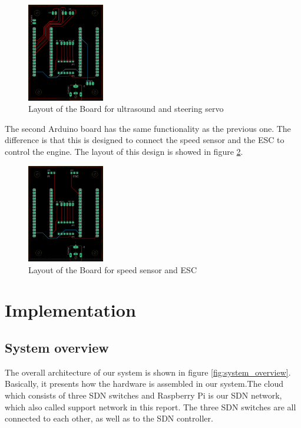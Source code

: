 \documentclass[11pt, titlepage]{article} %
\begin{document}
\begin{figure}
	\includegraphics[width=0.3\textwidth]{borad_layout_seervo_ultra.png}
	\caption{Layout of the Board for ultrasound and steering servo}
	\label{fig:board_layout_ultra_servo}
\end{figure}

The second Arduino board has the same functionality as the previous one. The difference is that this is designed to connect the speed sensor and the ESC to control the engine. The layout of this design is showed in figure \ref{fig:board_layout_ir_esc}.

\begin{figure}
	\includegraphics[width=0.3\textwidth]{borad_layout_ir_esc.png}
	\caption{Layout of the Board for speed sensor and ESC}
	\label{fig:board_layout_ir_esc}
\end{figure}


\clearpage
\section{Implementation}

\subsection{System overview}
The overall architecture of our system is shown in figure \ref{fig:system_overview}. Basically, it presents how the hardware is assembled in our system.The cloud which consists of three SDN switches and Raspberry Pi is our SDN network, which also called support network in this report. The three SDN switches are all connected to each other, as well as to the SDN controller.
\end{document}
